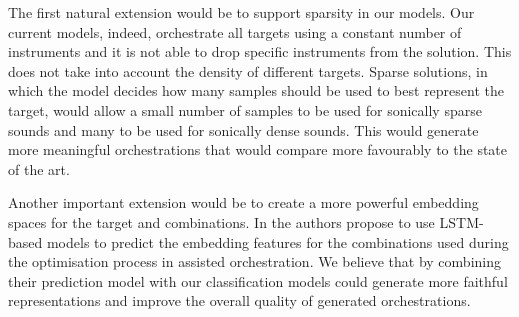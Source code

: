 \documentclass{article}
\begin{document}
The first natural extension would be to support sparsity in our models. Our current models, indeed, orchestrate all targets using a constant number of instruments and it is not able to drop specific instruments from the solution. This does not take into account the density of different targets. Sparse solutions, in which the model decides how many samples should be used to best represent the target, would allow a small number of samples to be used for sonically sparse sounds and many to be used for sonically dense sounds. This would generate more meaningful orchestrations that would compare more favourably to the state of the art.

Another important extension would be to create a more powerful embedding spaces for the target and combinations. In \cite{Gillick19} the authors propose to use LSTM-based models to predict the embedding features for the combinations used during the optimisation process in assisted orchestration. We believe that by combining their prediction model with our classification models could generate more faithful representations and improve the overall quality of generated orchestrations.
\end{document}
